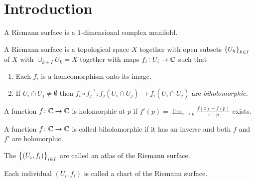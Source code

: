\documentclass[11pt,a4paper]{article}
\begin{document}
\maketitle


\newpage
\tableofcontents
\newpage

\section{Introduction}
\begin{definition}
    A Riemann surface is a $1$-dimensional complex manifold.
\end{definition}

\begin{definition}
    A Riemann surface is a topological space $X$ together with
    open subsets $\left\{U_k\right\}_{k \in I}$ of $X$ with
    $\cup_{k \in I} U_k = X$ together with maps $f_i \colon U_i \to \mathbb{C}$
    such that
    \begin{enumerate}
        \item[(1)] Each $f_i$ is a homeomorphism onto its image.
        \item[(2)] If $U_i \cap U_j \neq \emptyset$ then 
            $f_i \circ f_j^{-1} \colon 
            f_j(U_i \cap U_j) \to f_i(U_i \cap U_j)$ are \emph{biholomorphic}.
    \end{enumerate}
\end{definition}

\begin{remark}
    A function $f \colon \mathbb{C} \to \mathbb{C}$ is holomorphic at $p$ if 
    $f'(p) = \lim_{z \to p} \frac{f(z) - f(p)}{z - p}$ exists.
\end{remark}

\begin{definition}[Biholomorphism]
    A function $f \colon \mathbb{C} \to \mathbb{C}$ is called biholomorphic if it has an inverse
    and both $f$ and $f'$ are holomorphic.
\end{definition}

\begin{definition}[Atlas]
    The $\left\{(U_i, f_i)\right\}_{i \in I}$ are called an atlas of the Riemann surface.
\end{definition}

\begin{definition}[Chart]
    Each individual $(U_i, f_i)$ is called a chart of the Riemann surface.
\end{definition}
\end{document}

